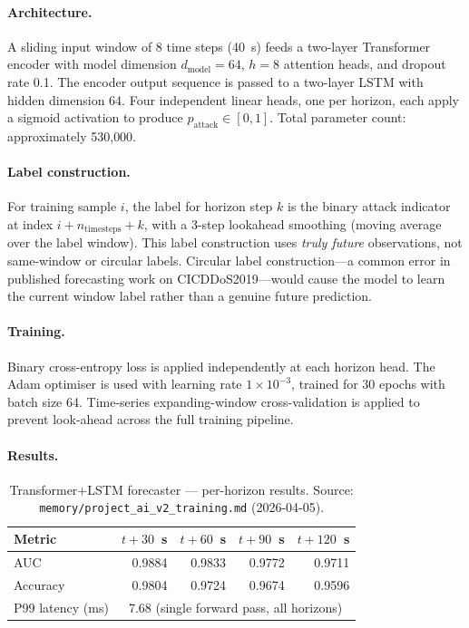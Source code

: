 \paragraph{Architecture.}
A sliding input window of 8 time steps (40~s) feeds a two-layer
Transformer encoder with model dimension $d_{\text{model}} = 64$,
$h = 8$ attention heads, and dropout rate 0.1. The encoder output
sequence is passed to a two-layer LSTM with hidden dimension 64.
Four independent linear heads, one per horizon, each apply a sigmoid
activation to produce $p_{\text{attack}} \in [0,1]$. Total parameter
count: approximately 530{,}000.

\paragraph{Label construction.}
For training sample $i$, the label for horizon step $k$ is the binary
attack indicator at index $i + n_{\text{timesteps}} + k$, with a
3-step lookahead smoothing (moving average over the label window). This
label construction uses \emph{truly future} observations, not
same-window or circular labels. Circular label construction---a common
error in published forecasting work on CICDDoS2019---would cause the
model to learn the current window label rather than a genuine future
prediction.

\paragraph{Training.}
Binary cross-entropy loss is applied independently at each horizon head.
The Adam optimiser is used with learning rate $1 \times 10^{-3}$, trained
for 30 epochs with batch size 64. Time-series expanding-window
cross-validation is applied to prevent look-ahead across the full training
pipeline.

\paragraph{Results.}

\begin{table}[H]
\centering
\small
\caption{Transformer+LSTM forecaster --- per-horizon results.
Source: \texttt{memory/project\_ai\_v2\_training.md} (2026-04-05).}
\label{tab:forecast}
\begin{tabular}{@{}lrrrr@{}}
\toprule
Metric & $t{+}30$~s & $t{+}60$~s & $t{+}90$~s & $t{+}120$~s \\
\midrule
AUC      & 0.9884 & 0.9833 & 0.9772 & 0.9711 \\
Accuracy & 0.9804 & 0.9724 & 0.9674 & 0.9596 \\
\midrule
P99 latency (ms)
  & \multicolumn{4}{c}{7.68 \quad (single forward pass, all horizons)} \\
\bottomrule
\end{tabular}
\end{table}

